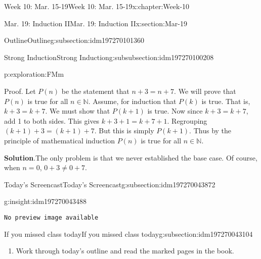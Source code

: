 \documentclass[oneside,10pt,]{book}
\newcommand{\blocktitlefont}{\relax}
\newcommand{\mono}[1]{\texttt{#1}}
\numberwithin{equation}{section}
\newlength{\qrsize}
\newlength{\previewwidth}
\def\N{{\mathbb N}}
\newcommand{\N}{\mathbb N}
\begin{document}
\begin{chapterptx}{Week 10: Mar. 15-19}{}{Week 10: Mar. 15-19}{}{}{x:chapter:Week-10}
\begin{sectionptx}{Mar. 19: Induction II}{}{Mar. 19: Induction II}{}{}{x:section:Mar-19}
\begin{subsectionptx}{Outline}{}{Outline}{}{}{g:subsection:idm197270101360}
\begin{subsubsectionptx}{Strong Induction}{}{Strong Induction}{}{}{g:subsubsection:idm197270100208}
\begin{exploration}{}{p:exploration:FMm}
\par
Proof. Let \(P(n)\) be the statement that \(n + 3 = n + 7\). We will prove that \(P(n)\) is true for all \(n \in \N\). Assume, for induction that \(P(k)\) is true. That is, \(k+3 = k+7\). We must show that \(P(k+1)\) is true. Now since \(k + 3 = k + 7\), add 1 to both sides. This gives \(k + 3 + 1 = k + 7 + 1\). Regrouping \((k+1) + 3 = (k+1) + 7\). But this is simply \(P(k+1)\). Thus by the principle of mathematical induction \(P(n)\) is true for all \(n \in \N\).%
\par\smallskip%
\noindent\textbf{\blocktitlefont Solution}.\hypertarget{p:solution:OaF}{}\quad{}The only problem is that we never established the base case. Of course, when \(n = 0\), \(0+3 \ne 0+7\).%
\end{exploration}%
\end{subsubsectionptx}
\end{subsectionptx}
%
%
\typeout{************************************************}
\typeout{************************************************}
%
\begin{subsectionptx}{Today's Screencast}{}{Today's Screencast}{}{}{g:subsection:idm197270043872}
\begin{insight}{}{g:insight:idm197270043488}%
\setlength{\qrsize}{9em}
\setlength{\previewwidth}{\linewidth}
\addtolength{\previewwidth}{-\qrsize}
\begin{tcbraster}[raster columns=2, raster column skip=1pt, raster halign=center, raster force size=false, raster left skip=0pt, raster right skip=0pt]%
\begin{tcolorbox}[previewstyle, width=\previewwidth]%
\mono{No preview image available}%
\end{tcolorbox}%
\begin{tcolorbox}[qrstyle]%
[QR LINK]\end{tcolorbox}%
\end{tcbraster}%
\end{insight}
\end{subsectionptx}
%
%
\typeout{************************************************}
\typeout{************************************************}
%
\begin{subsectionptx}{If you missed class today}{}{If you missed class today}{}{}{g:subsection:idm197270043104}
%
\begin{enumerate}
\item{}Work through today's outline and read the marked pages in the book.%

\end{enumerate}
\end{subsectionptx}
\end{sectionptx}
\end{chapterptx}
\end{document}
